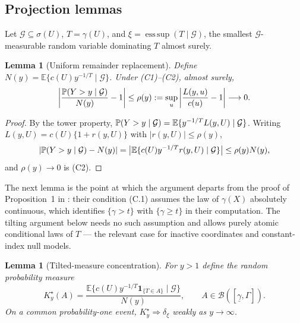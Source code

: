 \documentclass[bj,authoryear]{imsart}
\theoremstyle{plain}
\newtheorem{lemma}[theorem]{Lemma}
\DeclareMathOperator*{\esssup}{ess\,sup}
\newcommand{\E}{\mathbb E}\newcommand{\R}{\mathbb R}
\begin{document}
\begin{appendix}
\subsection{Projection lemmas}\label{app:projlem}

Let $\mathcal G\subseteq\sigma(U)$, $T=\gamma(U)$, and
$\xi=\esssup(T\mid\mathcal G)$, the smallest $\mathcal G$-measurable random
variable dominating $T$ almost surely.

\begin{lemma}[Uniform remainder replacement]\label{lem:app-remainder}
Define $N(y)=\E\{c(U)y^{-1/T}\mid\mathcal G\}$.  Under (C1)--(C2), almost
surely,
\begin{equation}
 \left|\frac{\mathbb P(Y>y\mid\mathcal G)}{N(y)}-1\right|
 \le\rho(y):=\sup_u\left|\frac{L(y,u)}{c(u)}-1\right|\longrightarrow0.
 \label{eq:A1}
\end{equation}
\end{lemma}

\begin{proof}
By the tower property,
$\Pp(Y>y\mid\mathcal G)=\E\{y^{-1/T}L(y,U)\mid\mathcal G\}$.  Writing
$L(y,U)=c(U)\{1+r(y,U)\}$ with $|r(y,U)|\le\rho(y)$,
\[
 |\Pp(Y>y\mid\mathcal G)-N(y)|
 =\bigl|\E\{c(U)y^{-1/T}r(y,U)\mid\mathcal G\}\bigr|
 \le\rho(y)N(y),
\]
and $\rho(y)\to0$ is (C2).
\end{proof}

The next lemma is the point at which the argument departs from the proof
of Proposition~1 in \citet{gardesPodgorny2025}: their condition (C.1)
assumes the law of $\gamma(X)$ absolutely continuous, which identifies
$\{\gamma>t\}$ with $\{\gamma\ge t\}$ in their computation.  The tilting
argument below needs no such assumption and allows purely atomic
conditional laws of $T$ --- the relevant case for inactive coordinates
and constant-index null models.

\begin{lemma}[Tilted-measure concentration]\label{lem:app-tilt}
For $y>1$ define the random probability measure
\[
 K_y^\star(A)=
 \frac{\E\{c(U)y^{-1/T}\mathbf 1_{\{T\in A\}}\mid\mathcal G\}}{N(y)},
 \qquad A\in\mathcal B([\underline\gamma,\Gamma]).
\]
On a common probability-one event, $K_y^\star\Rightarrow\delta_\xi$ weakly
as $y\to\infty$.
\end{lemma}


\end{appendix}
\end{document}
